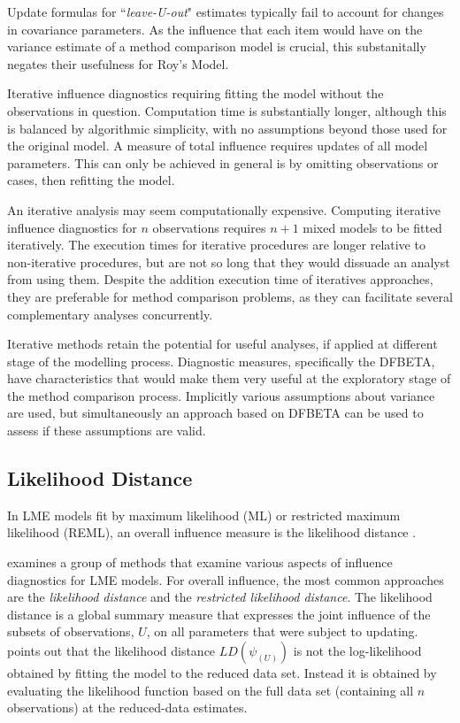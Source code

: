 \documentclass[12pt, a4paper]{report}
\theoremstyle{definition}
\theoremstyle{remark}
\begin{document}
Update formulas for ``\textit{leave-U-out}" estimates typically fail to account for changes in covariance parameters.  As the influence that each item would have on the variance estimate of a method comparison model is crucial, this substanitally negates their usefulness for Roy's Model.

Iterative influence diagnostics requiring fitting the model without the observations in question. Computation time is substantially longer, although this is balanced by algorithmic simplicity, with no assumptions beyond those used for the original model. A measure of total influence requires updates of all model parameters. This can only be achieved in general is by omitting observations or cases, then refitting the model. 


An iterative analysis may seem computationally expensive. Computing iterative influence diagnostics for $n$ observations requires $n+1$ mixed models to be fitted iteratively.
The execution times for iterative procedures are longer relative to non-iterative procedures, but are not so long that they would dissuade an analyst from using them.
Despite the addition execution time of iteratives
approaches, they are preferable for method comparison problems, as they can facilitate several complementary analyses concurrently. 


Iterative methods retain the potential for useful analyses, if applied at different stage of the modelling process. Diagnostic measures, specifically the DFBETA, have characteristics that would make them very useful at the exploratory stage of the method comparison process. Implicitly various assumptions about variance are used, but simultaneously an approach based on DFBETA can be used to assess if these assumptions are valid.




\subsection{Likelihood Distance}
In LME models fit by
 maximum likelihood (ML) or  restricted maximum likelihood (REML), an overall influence measure is the  likelihood distance \citep{CookWeisberg}.

\citet{west} examines a group of methods that examine various aspects of influence diagnostics for LME models. For overall influence, the most common approaches are the \textit{likelihood distance} and the \textit{restricted likelihood distance}.
The  likelihood distance is a global summary measure that expresses the joint influence of the subsets of observations, $U$, on all parameters that were subject to updating. \citet{schabenberger} points out that the likelihood distance $LD(\psi_{(U)})$ is not the log-likelihood obtained by fitting the model to the reduced data set. Instead it is obtained by evaluating the likelihood function based on the full data set (containing all $n$ observations) at the reduced-data estimates.
\end{document}
